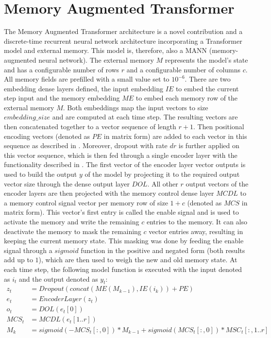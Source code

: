 \documentclass[draft,final]{vutinfth} %
\begin{document}
    \section{Memory Augmented Transformer} \label{mat}
    The Memory Augmented Transformer architecture is a novel contribution and a discrete-time recurrent neural network architecture incorporating a Transformer model and external memory.
    This model is, therefore, also a MANN (memory-augmented neural network).
    The external memory $M$ represents the model's state and has a configurable number of rows $r$ and a configurable number of columns $c$.
    All memory fields are prefilled with a small value set to $10^{-6}$.
    There are two embedding dense layers defined, the input embedding $IE$ to embed the current step input and the memory embedding $ME$ to embed each memory row of the external memory $M$.
    Both embeddings map the input vectors to size $embedding\_size$ and are computed at each time step. The resulting vectors are then concatenated together to a vector sequence of length $r+1$.
    Then positional encoding vectors (denoted as $PE$ in matrix form) are added to each vector in this sequence as described in .
    Moreover, dropout with rate $dr$ is further applied on this vector sequence, which is then fed through a single encoder layer with the functionality described in .
    The first vector of the encoder layer vector outputs is used to build the output $y$ of the model by projecting it to the required output vector size through the dense output layer $DOL$.
    All other $r$ output vectors of the encoder layers are then projected with the memory control dense layer $MCDL$ to a memory control signal vector per memory row of size $1 + c$ (denoted as $MCS$ in matrix form).
    This vector's first entry is called the enable signal and is used to activate the memory and write the remaining $c$ entries to the memory.
    It can also deactivate the memory to mask the remaining $c$ vector entries away, resulting in keeping the current memory state.
    This masking was done by feeding the enable signal through a $sigmoid$ function in the positive and negated form (both results add up to $1$), which are then used to weigh the new and old memory state.
    At each time step, the following model function is executed with the input denoted as $i_t$ and the output denoted as $y_t$:
    \begin{align}
        z_t &= Dropout(concat(ME(M_{k-1}), IE(i_k)) + PE) \\
        e_t &= EncoderLayer(z_t) \\
        o_t &= DOL(e_t[0]) \\
        MCS_t &= MCDL(e_t[1..r]) \\
        M_k &= sigmoid(-MCS_t[:,0]) * M_{k-1} + sigmoid(MCS_t[:,0]) * MSC_t[:,1..r]
    \end{align}
\end{document}

